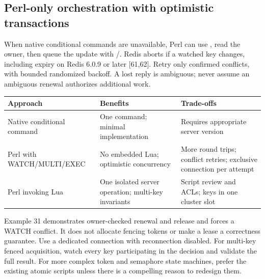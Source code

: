 \subsection{Perl-only orchestration with optimistic transactions}\label{sec:redis-watch}
When native conditional commands are unavailable, Perl can use , read the owner, then queue the update with /. Redis aborts if a watched key changes, including expiry on Redis 6.0.9 or later [61,62]. Retry only confirmed conflicts, with bounded randomized backoff. A lost reply is ambiguous; never assume an ambiguous renewal authorizes additional work.
\begin{longtable}{L{.25\linewidth}L{.32\linewidth}L{.35\linewidth}}\toprule Approach & Benefits & Trade-offs \\ \midrule\endhead
Native conditional command & One command; minimal implementation & Requires appropriate server version \\
Perl with WATCH/MULTI/EXEC & No embedded Lua; optimistic concurrency & More round trips; conflict retries; exclusive connection per attempt \\
Perl invoking Lua & One isolated server operation; multi-key invariants & Script review and ACLs; keys in one cluster slot \\
\bottomrule\end{longtable}
Example 31 demonstrates owner-checked renewal and release and forces a WATCH conflict. It does not allocate fencing tokens or make a lease a correctness guarantee. Use a dedicated connection with reconnection disabled. For multi-key fenced acquisition, watch every key participating in the decision and validate the full result. For more complex token and semaphore state machines, prefer the existing atomic scripts unless there is a compelling reason to redesign them.


